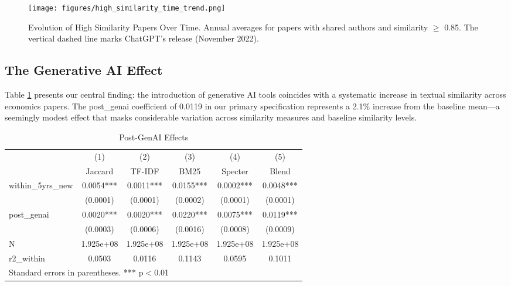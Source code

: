 \documentclass[12pt]{article}
\begin{document}
\begin{figure}[htbp]
\centering
\texttt{[image: figures/high\_similarity\_time\_trend.png]}
\caption{Evolution of High Similarity Papers Over Time. Annual averages for papers with shared authors and similarity $\geq$ 0.85. The vertical dashed line marks ChatGPT's release (November 2022).}
\label{fig:temporal_evolution}
\end{figure}

\subsection{The Generative AI Effect}

Table \ref{tab:genai} presents our central finding: the introduction of generative AI tools coincides with a systematic increase in textual similarity across economics papers. The post\_genai coefficient of 0.0119 in our primary specification represents a 2.1\% increase from the baseline mean—a seemingly modest effect that masks considerable variation across similarity measures and baseline similarity levels.

\begin{table}[htbp]\centering
\caption{Post-GenAI Effects}
\label{tab:genai}
\begin{tabular}{l*{5}{c}}
\toprule
                    &\multicolumn{1}{c}{(1)}&\multicolumn{1}{c}{(2)}&\multicolumn{1}{c}{(3)}&\multicolumn{1}{c}{(4)}&\multicolumn{1}{c}{(5)}\\
                    &\multicolumn{1}{c}{Jaccard}&\multicolumn{1}{c}{TF-IDF}&\multicolumn{1}{c}{BM25}&\multicolumn{1}{c}{Specter}&\multicolumn{1}{c}{Blend}\\
\midrule
within\_5yrs\_new     &      0.0054***&      0.0011***&      0.0155***&      0.0002***&      0.0048***\\
                    &    (0.0001)         &    (0.0001)         &    (0.0002)         &    (0.0001)         &    (0.0001)         \\
post\_genai          &      0.0020***&      0.0020***&      0.0220***&      0.0075***&      0.0119***\\
                    &    (0.0003)         &    (0.0006)         &    (0.0016)         &    (0.0008)         &    (0.0009)         \\
\midrule
N                   &  1.925e+08         &  1.925e+08         &  1.925e+08         &  1.925e+08         &  1.925e+08         \\
r2\_within           &      0.0503         &      0.0116         &      0.1143         &      0.0595         &      0.1011         \\
\bottomrule
\multicolumn{6}{l}{\footnotesize Standard errors in parentheses. *** p$<$0.01}
\end{tabular}
\end{table}
\end{document}
